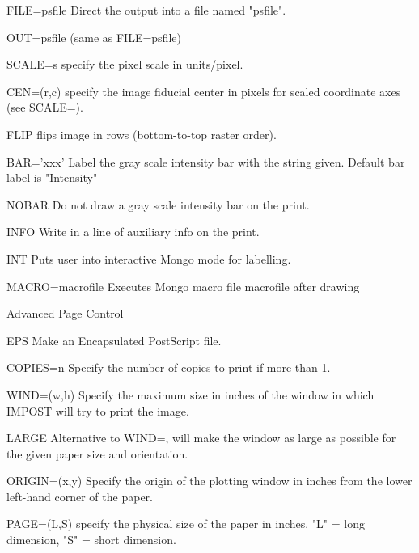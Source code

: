 \begin{command}
  \item[FILE=psfile]{Direct the output into a file named "psfile".}
  \item[OUT=psfile]{(same as FILE=psfile)}
  \item[SCALE=s ]{specify the pixel scale in units/pixel.}
  \item[CEN=(r,c)]{specify the image fiducial center in pixels for
                  scaled coordinate axes (see SCALE=).}
  \item[FLIP ]{flips image in rows (bottom-to-top raster order).}
  \item[BAR='xxx' ]{Label the gray scale intensity bar with the string
                    given.  Default bar label is "Intensity"}
  \item[NOBAR ]{Do not draw a gray scale intensity bar on the print.}
  \item[INFO ]{Write in a line of auxiliary info on the print.}
  \item[INT  ]{Puts user into interactive Mongo mode for labelling.}
  \item[MACRO=macrofile]{ Executes Mongo macro file macrofile after drawing}
  \item[Advanced Page Control\hfill]{}
  \item[EPS]{Make an Encapsulated PostScript file.}
  \item[COPIES=n ]{Specify the number of copies to print if more than 1.}
  \item[WIND=(w,h)]{Specify the maximum size in inches of the window in 
                    which IMPOST will try to print the image.}
  \item[LARGE ]{Alternative to WIND=, will make the window as large as 
                possible for the given paper size and orientation.}
  \item[ORIGIN=(x,y)]{Specify the origin of the plotting window in inches 
                      from the lower left-hand corner of the paper.}
  \item[PAGE=(L,S) ]{specify the physical size of the paper in inches.
                     "L" = long dimension, "S" = short dimension.}
\end{command}
